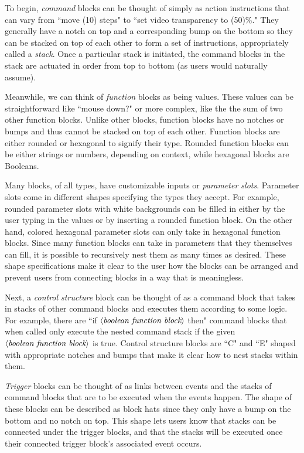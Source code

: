 To begin, \emph{command} blocks can be thought of simply as action instructions that can vary from ``move (10) steps" to ``set video transparency to (50)\%." They generally have a notch on top and a corresponding bump on the bottom so they can be stacked on top of each other to form a set of instructions, appropriately called a \emph{stack}. Once a particular stack is initiated, the command blocks in the stack are actuated in order from top to bottom (as users would naturally assume).

Meanwhile, we can think of \emph{function} blocks as being values. These values can be straightforward like ``mouse down?" or more complex, like the the sum of two other function blocks. Unlike other blocks, function blocks have no notches or bumps and thus cannot be stacked on top of each other. Function blocks are either rounded or hexagonal to signify their type. Rounded function blocks can be either strings or numbers, depending on context, while hexagonal blocks are Booleans. 

Many blocks, of all types, have customizable inputs or \emph{parameter slots}. Parameter slots come in different shapes specifying the types they accept. For example, rounded parameter slots with white backgrounds can be filled in either by the user typing in the values or by inserting a rounded function block. On the other hand, colored hexagonal parameter slots can only take in hexagonal function blocks. Since many function blocks can take in parameters that they themselves can fill, it is possible to recursively nest them as many times as desired. These shape specifications make it clear to the user how the blocks can be arranged and prevent users from connecting blocks in a way that is meaningless.

Next, a \emph{control structure} block can be thought of as a command block that takes in stacks of other command blocks and executes them according to some logic. For example, there are ``if $\left\langle \emph{boolean function block} \right\rangle$  then" command blocks that when called only execute the nested command stack if the given $\left\langle \emph{boolean function block} \right\rangle$ is true. Control structure blocks are ``C" and ``E" shaped with appropriate notches and bumps that make it clear how to nest stacks within them.

\emph{Trigger} blocks can be thought of as links between events and the stacks of command blocks that are to be executed when the events happen. The shape of these blocks can be described as block hats since they only have a bump on the bottom and no notch on top. This shape lets users know that stacks can be connected under the trigger blocks, and that the stacks will be executed once their connected trigger block's associated event occurs.

